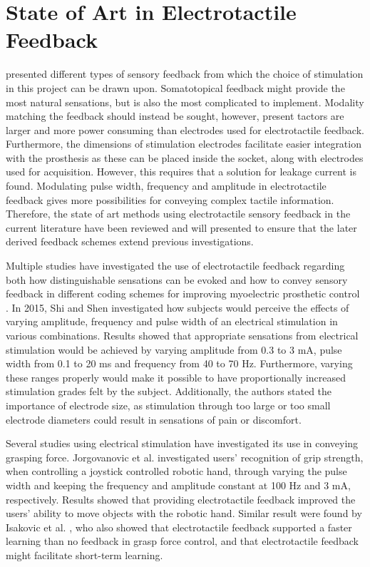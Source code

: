 \section{State of Art in Electrotactile Feedback} \label{SoA}

 presented different types of sensory feedback from which the choice of stimulation in this project can be drawn upon. Somatotopical feedback might provide the most natural sensations, but is also the most complicated to implement. Modality matching the feedback should instead be sought, however, present tactors are larger and more power consuming than electrodes used for electrotactile feedback. Furthermore, the dimensions of stimulation electrodes facilitate easier integration with the prosthesis as these can be placed inside the socket, along with electrodes used for acquisition. However, this requires that a solution for leakage current is found. Modulating pulse width, frequency and amplitude in electrotactile feedback gives more possibilities for conveying complex tactile information. Therefore, the state of art methods using electrotactile sensory feedback in the current literature have been reviewed and will presented to ensure that the later derived feedback schemes extend previous investigations. 

Multiple studies have investigated the use of electrotactile feedback regarding both how distinguishable sensations can be evoked and how to convey sensory feedback in different coding schemes for improving myoelectric prosthetic control \cite{Stephens-Fripp2018}. 
In 2015, Shi and Shen \cite{Shi2015} investigated how subjects would perceive the effects of varying amplitude, frequency and pulse width of an electrical stimulation in various combinations. Results showed that appropriate sensations from electrical stimulation would be achieved by varying amplitude from 0.3 to 3 mA, pulse width from 0.1 to 20 ms and frequency from 40 to 70 Hz. Furthermore, varying these ranges properly would make it possible to have proportionally increased stimulation grades felt by the subject. Additionally, the authors stated the importance of electrode size, as stimulation through too large or too small electrode diameters could result in sensations of pain or discomfort. \cite{Shi2015} 
     
Several studies \cite{Pamungkas2015,Xu2016,Jorgovanovic2014,Isakovic2016} using electrical stimulation have investigated its use in conveying grasping force. Jorgovanovic et al. \cite{Jorgovanovic2014} investigated users' recognition of grip strength, when controlling a joystick controlled robotic hand, through varying the pulse width and keeping the frequency and amplitude constant at 100 Hz and 3 mA, respectively. Results showed that providing electrotactile feedback improved the users' ability to move objects with the robotic hand. \cite{Jorgovanovic2014} Similar result were found by Isakovic et al. \cite{Isakovic2016}, who also showed that electrotactile feedback supported a faster learning than no feedback in grasp force control, and that electrotactile feedback might facilitate short-term learning. 

